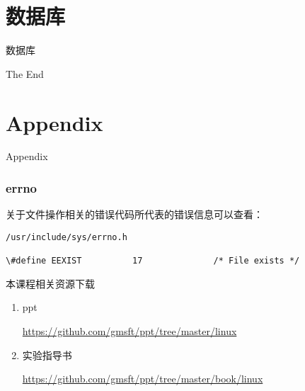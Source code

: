\documentclass{beamer}
\begin{document}
\section{数据库}
\begin{frame}
\Huge{\centerline{数据库}}
\end{frame}

\begin{frame}
\Huge{\centerline{The End}}
\end{frame}



\section{Appendix}
\begin{frame}
\Huge{\centerline{Appendix}}
\end{frame}
\begin{frame}[fragile]
\frametitle{errno}
\label{ferr}
关于文件操作相关的错误代码所代表的错误信息可以查看：
\begin{block}{}
\begin{lstlisting}
/usr/include/sys/errno.h

\#define EEXIST          17              /* File exists */
\end{lstlisting}
\end{block}
\end{frame}
\begin{frame}{本课程相关资源下载}
\begin{enumerate}
\item
ppt

\url{https://github.com/gmsft/ppt/tree/master/linux}
\item
实验指导书

\url{https://github.com/gmsft/ppt/tree/master/book/linux}
\end{enumerate}
\end{frame}
\end{document}

